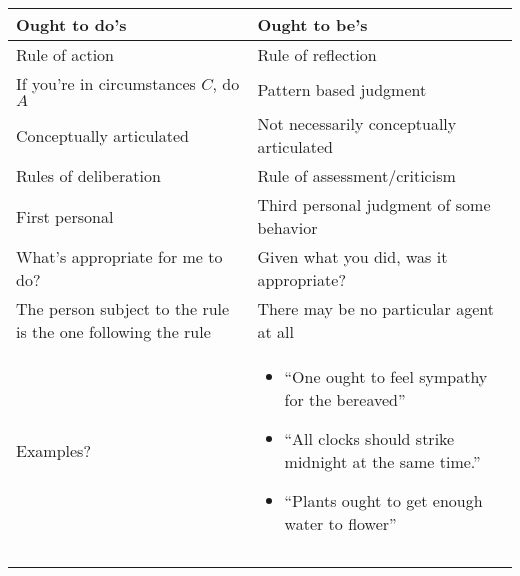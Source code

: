
\begin{table}[]
    \begin{tabular}{|l|l|}
    \hline
  Ought to do's       &  Ought to be's \\ \hline
  Rule of action     & Rule of reflection \\ \hline
  If you're in circumstances $C$, do $A$ &  Pattern based judgment \\ \hline
  Conceptually articulated & Not necessarily conceptually articulated \\ \hline
  Rules of deliberation  & Rule of assessment/criticism \\ \hline
  First personal  &  Third personal judgment of some behavior \\ \hline
  What's appropriate for me to do?  & Given what you did, was it appropriate? \\ \hline
  The person subject to the rule is the one following the rule  &  There may be no particular agent at all \\ \hline
  Examples?  & \begin{itemize}
  \item ``One ought to feel sympathy for the bereaved''
  \item ``All clocks should strike midnight at the same time.''
  \item ``Plants ought to get enough water to flower''
  \end{itemize}   \\ \hline
    &  \\ \hline
    &  \\ \hline
    \end{tabular}
    \caption{}
    \label{tab:ought}
\end{table}

